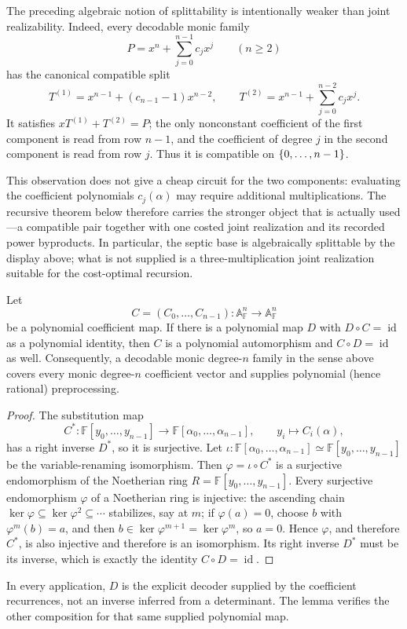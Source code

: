 \begin{remark}
\label{rem:canonical-split}
The preceding algebraic notion of splittability is intentionally weaker than
joint realizability.  Indeed, every decodable monic family
\[
  P=x^n+\sum_{j=0}^{n-1}c_jx^j\qquad(n\ge2)
\]
has the canonical compatible split
\[
  T^{(1)}=x^{n-1}+(c_{n-1}-1)x^{n-2},\qquad
  T^{(2)}=x^{n-1}+\sum_{j=0}^{n-2}c_jx^j.
\]
It satisfies $xT^{(1)}+T^{(2)}=P$; the only nonconstant coefficient of the
first component is read from row $n-1$, and the coefficient of degree $j$ in
the second component is read from row $j$.  Thus it is compatible on
$\{0,\dotsc,n-1\}$.

This observation does not give a cheap circuit for the two components:
evaluating the coefficient polynomials $c_j(\alpha)$ may require additional
multiplications.  The recursive theorem below therefore carries the stronger
object that is actually used---a compatible pair together with one
costed joint realization and its recorded power byproducts.  In particular,
the septic base is algebraically splittable by the display above; what is not
supplied is a three-multiplication joint realization suitable for the
cost-optimal recursion.
\end{remark}

\begin{lemma}
\label{lem:polynomial-left-inverse-automorphism}
Let
\[
  C=(C_0,\ldots,C_{n-1}):\mathbb A^n_{\mathbb F}\longrightarrow
       \mathbb A^n_{\mathbb F}
\]
be a polynomial coefficient map.  If there is a polynomial map $D$ with
$D\circ C=\operatorname{id}$ as a polynomial identity, then $C$ is a
polynomial automorphism and $C\circ D=\operatorname{id}$ as well.
Consequently, a decodable monic degree-$n$ family in the sense above covers
every monic degree-$n$ coefficient vector and supplies polynomial (hence
rational) preprocessing.
\end{lemma}
\begin{proof}
The substitution map
\[
  C^*:\mathbb F[y_0,\ldots,y_{n-1}]\longrightarrow
       \mathbb F[\alpha_0,\ldots,\alpha_{n-1}],
  \qquad y_i\longmapsto C_i(\alpha),
\]
has a right inverse $D^*$, so it is surjective.  Let
$\iota:\mathbb F[\alpha_0,\ldots,\alpha_{n-1}]\simeq
\mathbb F[y_0,\ldots,y_{n-1}]$ be the variable-renaming isomorphism.
Then $\varphi=\iota\circ C^*$ is a surjective endomorphism of the
Noetherian ring $R=\mathbb F[y_0,\ldots,y_{n-1}]$.  Every surjective endomorphism
$\varphi$ of a Noetherian ring is injective: the ascending chain
$\ker\varphi\subseteq\ker\varphi^2\subseteq\cdots$ stabilizes, say at
$m$; if $\varphi(a)=0$, choose $b$ with $\varphi^m(b)=a$, and then
$b\in\ker\varphi^{m+1}=\ker\varphi^m$, so $a=0$.  Hence $\varphi$, and
therefore $C^*$, is also
injective and therefore is an isomorphism.  Its right inverse $D^*$ must be
its inverse, which is exactly the identity
$C\circ D=\operatorname{id}$.
\end{proof}
In every application, $D$ is the explicit decoder supplied by the coefficient
recurrences, not an inverse inferred from a determinant.  The lemma verifies
the other composition for that same supplied polynomial map.

